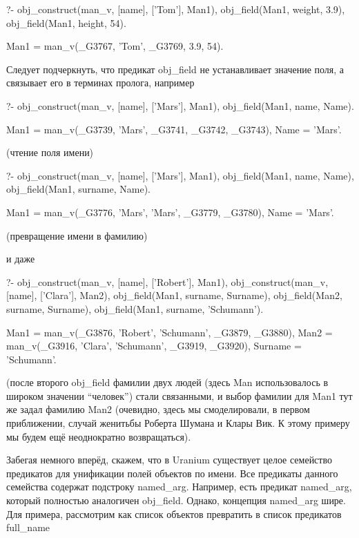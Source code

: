 \documentclass[a4paper]{book}
\def\ur{Uranium}
\begin{document}
\begin{example}{}{}
?- obj_construct(man_v, [name], ['Tom'], Man1), 
   obj_field(Man1, weight, 3.9), 
   obj_field(Man1, height, 54).

Man1 = man_v(_G3767, 'Tom', _G3769, 3.9, 54).
\end{example}

Следует подчеркнуть, что предикат obj\_field не устанавливает
значение поля, а связывает его в терминах пролога, например

\begin{example}{}{}
?- obj_construct(man_v, [name], ['Mars'], Man1), 
   obj_field(Man1, name, Name).

Man1 = man_v(_G3739, 'Mars', _G3741, _G3742, _G3743),
Name = 'Mars'.
\end{example}
(чтение поля имени)

\begin{example}{}{}
?- obj_construct(man_v, [name], ['Mars'], Man1), 
   obj_field(Man1, name, Name), 
   obj_field(Man1, surname, Name).

Man1 = man_v(_G3776, 'Mars', 'Mars', _G3779, _G3780),
Name = 'Mars'.
\end{example}
(превращение имени в фамилию)

и даже

\begin{example}{}{}
?- obj_construct(man_v, [name], ['Robert'], Man1), 
   obj_construct(man_v, [name], ['Clara'], Man2), 
   obj_field(Man1, surname, Surname), 
   obj_field(Man2, surname, Surname), 
   obj_field(Man1, surname, 'Schumann').

Man1 = man_v(_G3876, 'Robert', 'Schumann', _G3879, _G3880),
Man2 = man_v(_G3916, 'Clara', 'Schumann', _G3919, _G3920),
Surname = 'Schumann'.
\end{example}

(после второго obj\_field фамилии двух людей (здесь Man
использовалось в широком значении ``человек'') стали связанными,
и выбор фамилии для Man1 тут же задал фамилию Man2 (очевидно,
здесь мы смоделировали, в первом приближении, случай женитьбы
Роберта Шумана и Клары Вик. К этому примеру мы будем ещё
неоднократно возвращаться).

Забегая немного вперёд, скажем, что в \ur{} существует целое
семейство предикатов для унификации полей объектов по имени. Все
предикаты данного семейства содержат подстроку
named\_arg. Например, есть предикат named\_arg, который полностью
аналогичен obj\_field. Однако, концепция named\_arg шире. Для
примера, рассмотрим как список объектов превратить в список
предикатов full\_name
\end{document}
